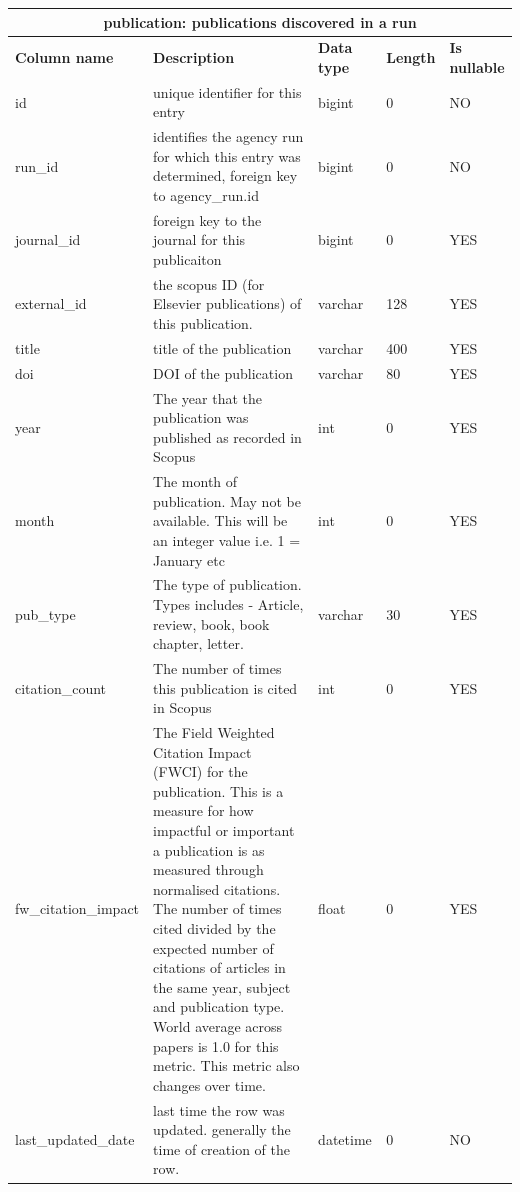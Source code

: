 \documentclass[titlepage, 11pt]{article}
\begin{document}
{\begin{table}[h!]
{\renewcommand{\arraystretch}{1.5}%
\begin{tabularx}{1\textwidth} {|p{3cm}|p{6.33cm}|p{2cm}|p{1.5cm}|p{1.5cm}|}
 \hline
 \multicolumn{5}{|c|}{\textbf{publication: publications discovered in a run}}\\
 \hline
 \textbf{Column name} & \textbf{Description} & \textbf{Data type} & \textbf{Length} & \textbf{Is nullable} \\
 \hline
 id & unique identifier for this entry & bigint  & 0   & NO  \\
 \hline
 run\_id & identifies the agency run for which this entry was determined, foreign key to agency\_run.id & bigint  & 0   & NO  \\
 \hline
 journal\_id & foreign key to the journal for this publicaiton& bigint  & 0   & YES \\
 \hline
 external\_id & the scopus ID (for Elsevier publications) of this publication. & varchar & 128 & YES \\
 \hline
 title & title of the publication & varchar & 400 & YES \\
 \hline
 doi  & DOI of the publication & varchar & 80  & YES \\
 \hline
 year & The year that the publication was published as recorded in Scopus & int & 0   & YES \\
 \hline
 month & The month of publication. May not be available. This will be an integer value i.e. 1 = January etc & int     & 0   & YES \\
 \hline
 pub\_type & The type of publication. Types includes - Article, review, book, book chapter, letter.  & varchar & 30  & YES \\
 \hline
 citation\_count & The number of times this publication is cited in Scopus & int     & 0   & YES \\
 \hline
 fw\_citation\_impact & The Field Weighted Citation Impact (FWCI) for the publication. This is a measure for how impactful or important a publication is as measured through normalised citations. The number of times cited divided by the expected number of citations of articles in the same year, subject and publication type. World average across papers is 1.0 for this metric. This metric also changes over time. & float & 0 & YES \\
\hline
last\_updated\_date & last time the row was updated. generally the time of creation of the row. & datetime & 0 & NO \\
\hline

\end{tabularx}
\label{table: appendix b - publication}
}
\end{table}

}
\end{document}
